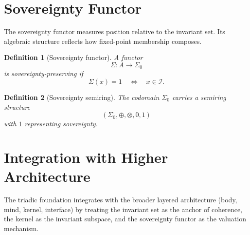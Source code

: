 \documentclass[12pt]{article}
\newtheorem{definition}{Definition}
\begin{document}
\section{Sovereignty Functor}

The sovereignty functor measures position relative to the invariant set.
Its algebraic structure reflects how fixed-point membership composes.

\begin{definition}[Sovereignty functor]
A functor
\[
\Sigma:A\to\Sigma_0
\]
is sovereignty-preserving if
\[
\Sigma(x)=1 \quad\Longleftrightarrow\quad x\in\mathcal{I}.
\]
\end{definition}

\begin{definition}[Sovereignty semiring]
The codomain $\Sigma_0$ carries a semiring structure
\[
(\Sigma_0,\oplus,\otimes,0,1)
\]
with $1$ representing sovereignty.
\end{definition}

\section{Integration with Higher Architecture}

The triadic foundation integrates with the broader layered architecture
(body, mind, kernel, interface) by treating the invariant set as the
anchor of coherence, the kernel as the invariant subspace, and the
sovereignty functor as the valuation mechanism.
\end{document}
